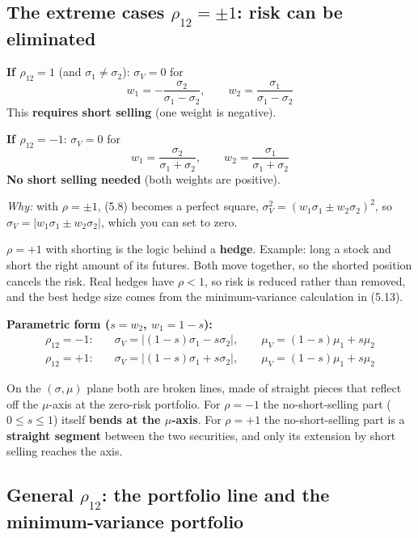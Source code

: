 \documentclass[titlepage,11pt,a4paper]{article}
\begin{document}
\subsection{The extreme cases \texorpdfstring{$\rho_{12}=\pm1$}{rho12 = +-1}: risk can be eliminated}

\begin{result}
\textbf{If $\rho_{12}=1$} (and $\sigma_1\ne\sigma_2$): $\sigma_V=0$ for
\[w_1=-\frac{\sigma_2}{\sigma_1-\sigma_2},\qquad w_2=\frac{\sigma_1}{\sigma_1-\sigma_2} \tag{5.9}\]
This \textbf{requires short selling} (one weight is negative).

\textbf{If $\rho_{12}=-1$}: $\sigma_V=0$ for
\[w_1=\frac{\sigma_2}{\sigma_1+\sigma_2},\qquad w_2=\frac{\sigma_1}{\sigma_1+\sigma_2} \tag{5.10}\]
\textbf{No short selling needed} (both weights are positive).
\end{result}

\emph{Why:} with $\rho=\pm1$, (5.8) becomes a perfect square, $\sigma_V^2=(w_1\sigma_1\pm w_2\sigma_2)^2$, so $\sigma_V=|w_1\sigma_1\pm w_2\sigma_2|$, which you can set to zero.

\begin{practice}
$\rho=+1$ with shorting is the logic behind a \textbf{hedge}. Example: long a stock and short the right amount of its futures. Both move together, so the shorted position cancels the risk. Real hedges have $\rho<1$, so risk is reduced rather than removed, and the best hedge size comes from the minimum-variance calculation in (5.13).
\end{practice}

\textbf{Parametric form ($s=w_2$, $w_1=1-s$):}
\begin{align*}
\rho_{12}=-1:&\quad \sigma_V=|(1-s)\sigma_1-s\sigma_2|,\qquad \mu_V=(1-s)\mu_1+s\mu_2\\
\rho_{12}=+1:&\quad \sigma_V=|(1-s)\sigma_1+s\sigma_2|,\qquad \mu_V=(1-s)\mu_1+s\mu_2
\end{align*}

On the $(\sigma,\mu)$ plane both are broken lines, made of straight pieces that reflect off the $\mu$-axis at the zero-risk portfolio. For $\rho=-1$ the no-short-selling part ($0\le s\le1$) itself \textbf{bends at the $\mu$-axis}. For $\rho=+1$ the no-short-selling part is a \textbf{straight segment} between the two securities, and only its extension by short selling reaches the axis.

\subsection{General \texorpdfstring{$\rho_{12}$}{rho12}: the portfolio line and the minimum-variance portfolio}
\end{document}
